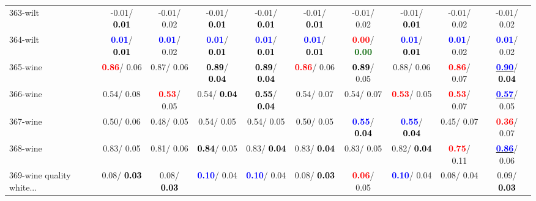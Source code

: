 \begin{table}[h]
\begin{center}
{\begin{tabular}{lc|c|c|c|c|c|c|c|c}
363-wilt &  -0.01/\textcolor{black}{\textbf{  0.01}} &  -0.01/  0.02 &  -0.01/\textcolor{black}{\textbf{  0.01}} &  -0.01/\textcolor{black}{\textbf{  0.01}} &  -0.01/\textcolor{black}{\textbf{  0.01}} &  -0.01/  0.02 &  -0.01/\textcolor{black}{\textbf{  0.01}} &  -0.01/  0.02 &  -0.01/  0.02 \\
364-wilt & \textcolor{blue}{\textbf{  0.01}}/\textcolor{black}{\textbf{  0.01}} & \textcolor{blue}{\textbf{  0.01}}/  0.02 & \textcolor{blue}{\textbf{  0.01}}/\textcolor{black}{\textbf{  0.01}} & \textcolor{blue}{\textbf{  0.01}}/\textcolor{black}{\textbf{  0.01}} & \textcolor{blue}{\textbf{  0.01}}/\textcolor{black}{\textbf{  0.01}} & \textcolor{red}{\textbf{  0.00}}/\textcolor{darkgreen}{\textbf{  0.00}} & \textcolor{blue}{\textbf{  0.01}}/\textcolor{black}{\textbf{  0.01}} & \textcolor{blue}{\textbf{  0.01}}/  0.02 & \textcolor{blue}{\textbf{  0.01}}/  0.02 \\
365-wine & \textcolor{red}{\textbf{  0.86}}/  0.06 &   0.87/  0.06 & \textcolor{black}{\textbf{  0.89}}/\textcolor{black}{\textbf{  0.04}} & \textcolor{black}{\textbf{  0.89}}/\textcolor{black}{\textbf{  0.04}} & \textcolor{red}{\textbf{  0.86}}/  0.06 & \textcolor{black}{\textbf{  0.89}}/  0.05 &   0.88/  0.06 & \textcolor{red}{\textbf{  0.86}}/  0.07 & \underline{\textcolor{blue}{\textbf{  0.90}}}/\textcolor{black}{\textbf{  0.04}} \\
366-wine &   0.54/  0.08 & \textcolor{red}{\textbf{  0.53}}/  0.05 &   0.54/\textcolor{black}{\textbf{  0.04}} & \textcolor{black}{\textbf{  0.55}}/\textcolor{black}{\textbf{  0.04}} &   0.54/  0.07 &   0.54/  0.07 & \textcolor{red}{\textbf{  0.53}}/  0.05 & \textcolor{red}{\textbf{  0.53}}/  0.07 & \underline{\textcolor{blue}{\textbf{  0.57}}}/  0.05 \\ \hline
367-wine &   0.50/  0.06 &   0.48/  0.05 &   0.54/  0.05 &   0.54/  0.05 &   0.50/  0.05 & \textcolor{blue}{\textbf{  0.55}}/\textcolor{black}{\textbf{  0.04}} & \textcolor{blue}{\textbf{  0.55}}/\textcolor{black}{\textbf{  0.04}} &   0.45/  0.07 & \textcolor{red}{\textbf{  0.36}}/  0.07 \\
368-wine &   0.83/  0.05 &   0.81/  0.06 & \textcolor{black}{\textbf{  0.84}}/  0.05 &   0.83/\textcolor{black}{\textbf{  0.04}} &   0.83/\textcolor{black}{\textbf{  0.04}} &   0.83/  0.05 &   0.82/\textcolor{black}{\textbf{  0.04}} & \textcolor{red}{\textbf{  0.75}}/  0.11 & \underline{\textcolor{blue}{\textbf{  0.86}}}/  0.06 \\
369-wine quality white... &   0.08/\textcolor{black}{\textbf{  0.03}} &   0.08/\textcolor{black}{\textbf{  0.03}} & \textcolor{blue}{\textbf{  0.10}}/  0.04 & \textcolor{blue}{\textbf{  0.10}}/  0.04 &   0.08/\textcolor{black}{\textbf{  0.03}} & \textcolor{red}{\textbf{  0.06}}/  0.05 & \textcolor{blue}{\textbf{  0.10}}/  0.04 &   0.08/  0.04 &   0.09/\textcolor{black}{\textbf{  0.03}} \\

\end{tabular}}
\end{center}
\end{table}
